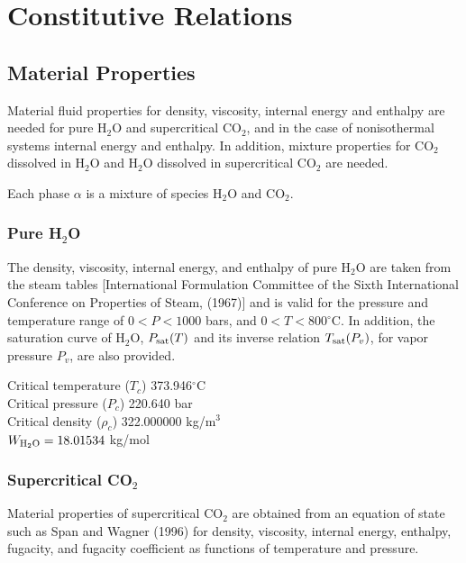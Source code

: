 \documentclass[12pt]{article}
\newcommand{\degc}{$^\circ$C}
\renewcommand{\c}{{\rm CO_2}}
\renewcommand{\a}{{\alpha}}
\begin{document}
\section{Constitutive Relations}

\subsection{Material Properties}

Material fluid properties for density, viscosity, internal energy and enthalpy are needed for pure H$_2$O and supercritical CO$_2$, and in the case of nonisothermal systems internal energy and enthalpy. In addition, mixture properties for CO$_2$ dissolved in H$_2$O and H$_2$O dissolved in supercritical CO$_2$ are needed. 


Each phase $\a$ is a mixture of species H$_2$O and CO$_2$. 


\subsubsection{Pure H$_2$O}

The density, viscosity, internal energy, and enthalpy of pure H$_2$O are taken from the steam tables [International Formulation Committee of the Sixth International Conference on Properties of Steam, (1967)] and is valid for the pressure and temperature range of $0 < P < 1000$ bars, and $0 < T < 800$\degc. In addition, the saturation curve of H$_2$O, $P_{\rm sat}(T)$ and its inverse relation $T_{\rm sat}(P_v)$, for vapor pressure $P_v$, are also provided.

\noindent
Critical temperature ($T_c$)	373.946\degc\\
Critical pressure ($P_c$)	220.640 bar\\
Critical density ($\rho_c$)	322.000000 kg/m$^3$\\
$W_{\rm H_2O} = 18.01534$ kg/mol

\subsubsection{Supercritical CO$_2$}

Material properties of supercritical CO$_2$ are obtained from an equation of state such as Span and Wagner (1996) for density, viscosity, internal energy, enthalpy, fugacity, and fugacity coefficient as functions of temperature and pressure.
\end{document}
